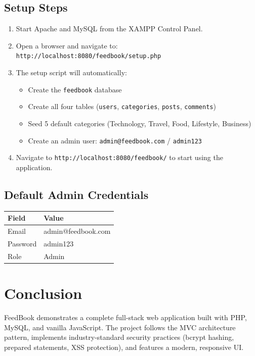 \documentclass[12pt,a4paper]{report}
\begin{document}
\section{Setup Steps}
\begin{enumerate}
    \item Start Apache and MySQL from the XAMPP Control Panel.
    \item Open a browser and navigate to: \texttt{http://localhost:8080/feedbook/setup.php}
    \item The setup script will automatically:
    \begin{itemize}
        \item Create the \texttt{feedbook} database
        \item Create all four tables (\texttt{users}, \texttt{categories}, \texttt{posts}, \texttt{comments})
        \item Seed 5 default categories (Technology, Travel, Food, Lifestyle, Business)
        \item Create an admin user: \texttt{admin@feedbook.com} / \texttt{admin123}
    \end{itemize}
    \item Navigate to \texttt{http://localhost:8080/feedbook/} to start using the application.
\end{enumerate}

\section{Default Admin Credentials}
\begin{table}[h]
\centering
\begin{tabular}{l l}
\toprule
\textbf{Field} & \textbf{Value} \\
\midrule
Email & admin@feedbook.com \\
Password & admin123 \\
Role & Admin \\
\bottomrule
\end{tabular}
\end{table}

\chapter{Conclusion}

FeedBook demonstrates a complete full-stack web application built with PHP, MySQL, and vanilla JavaScript. The project follows the MVC architecture pattern, implements industry-standard security practices (bcrypt hashing, prepared statements, XSS protection), and features a modern, responsive UI.
\end{document}
